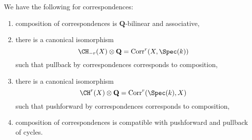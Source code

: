 \begin{lemma}
\label{lemma-composition-correspondences}
We have the following for correspondences:
\begin{enumerate}
\item composition of correspondences is $\mathbf{Q}$-bilinear
and associative,
\item there is a canonical isomorphism
$$
\CH_{-r}(X) \otimes \mathbf{Q} = \text{Corr}^r(X, \Spec(k))
$$
such that pullback by correspondences corresponds to composition,
\item there is a canonical isomorphism
$$
\CH^r(X) \otimes \mathbf{Q} = \text{Corr}^r(\Spec(k), X)
$$
such that pushforward by correspondences corresponds to composition,
\item composition of correspondences is compatible with pushforward and
pullback of cycles.
\end{enumerate}
\end{lemma}

